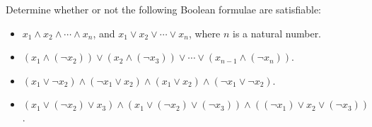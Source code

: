 Determine whether or not the following Boolean formulae are satisfiable:

\begin{itemize}
    \item $x_1 \land x_2 \land \cdots \land x_n$, and $x_1 \lor x_2 \lor \cdots \lor x_n$, where $n$ is a natural number.
    \item $(x_1 \land (\neg x_2)) \lor (x_2 \land (\neg x_3)) \lor \cdots \lor (x_{n - 1} \land (\neg x_n))$.
    \item $(x_1 \lor \neg x_2) \land (\neg x_1 \lor x_2) \land (x_1 \lor x_2) \land (\neg x_1 \lor \neg x_2)$.
    \item $(x_1 \lor (\neg x_2) \lor x_3) \land (x_1 \lor (\neg x_2) \lor (\neg x_3)) \land ((\neg x_1) \lor x_2 \lor (\neg x_3))$.
\end{itemize}